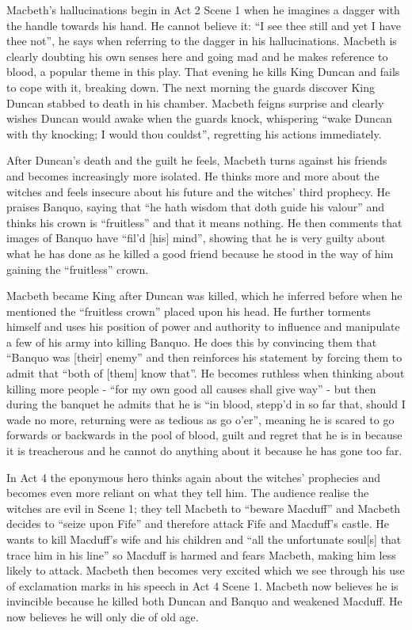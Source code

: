 \documentclass{article}
\begin{document}
Macbeth's hallucinations begin in Act 2 Scene 1 when he imagines a dagger with the handle towards his hand.  He cannot believe it: ``I see thee still and yet I have thee not'', he says when referring to the dagger in his hallucinations.  Macbeth is clearly doubting his own senses here and going mad and he makes reference to blood, a popular theme in this play.  That evening he kills King Duncan and fails to cope with it, breaking down.  The next morning the guards discover King Duncan stabbed to death in his chamber.  Macbeth feigns surprise and clearly wishes Duncan would awake when the guards knock, whispering ``wake Duncan with thy knocking; I would thou couldst'', regretting his actions immediately.

After Duncan's death and the guilt he feels, Macbeth turns against his friends and becomes increasingly more isolated.  He thinks more and more about the witches and feels insecure about his future and the witches' third prophecy.  He praises Banquo, saying that ``he hath wisdom that doth guide his valour'' and thinks his crown is ``fruitless'' and that it means nothing.  He then comments that images of Banquo have ``fil'd [his] mind'', showing that he is very guilty about what he has done as he killed a good friend because he stood in the way of him gaining the ``fruitless'' crown.

Macbeth became King after Duncan was killed, which he inferred before when he mentioned the ``fruitless crown'' placed upon his head.  He further torments himself and uses his position of power and authority to influence and manipulate a few of his army into killing Banquo.  He does this by convincing them that ``Banquo was [their] enemy'' and then reinforces his statement by forcing them to admit that ``both of [them] know that''.  He becomes ruthless when thinking about killing more people - ``for my own good all causes shall give way'' - but then during the banquet he admits that he is ``in blood, stepp'd in so far that, should I wade no more, returning were as tedious as go o'er'', meaning he is scared to go forwards or backwards in the pool of blood, guilt and regret that he is in because it is treacherous and he cannot do anything about it because he has gone too far.

In Act 4 the eponymous hero thinks again about the witches' prophecies and becomes even more reliant on what they tell him.  The audience realise the witches are evil in Scene 1; they tell Macbeth to ``beware Macduff'' and Macbeth decides to ``seize upon Fife'' and therefore attack Fife and Macduff's castle.  He wants to kill Macduff's wife and his children and ``all the unfortunate soul[s] that trace him in his line'' so Macduff is harmed and fears Macbeth, making him less likely to attack.  Macbeth then becomes very excited which we see through his use of exclamation marks in his speech in Act 4 Scene 1.  Macbeth now believes he is invincible because he killed both Duncan and Banquo and weakened Macduff.  He now believes he will only die of old age.
\end{document}

